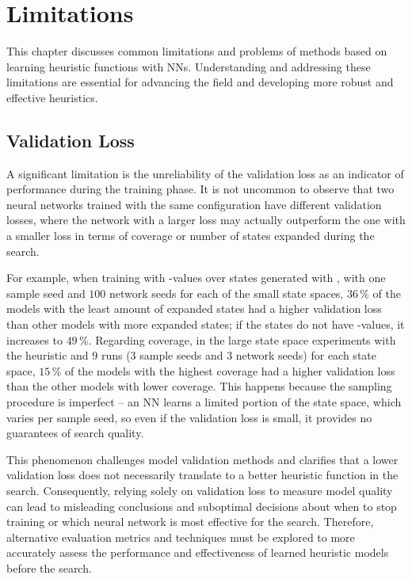 \chapter{Limitations}
\label{sec:limitations}

This chapter discusses common limitations and problems of methods based on learning heuristic functions with NNs. Understanding and addressing these limitations are essential for advancing the field and developing more robust and effective heuristics.

\section{Validation Loss}

A significant limitation is the unreliability of the validation loss as an indicator of performance during the training phase. It is not uncommon to observe that two neural networks trained with the same configuration have different validation losses, where the network with a larger loss may actually outperform the one with a smaller loss in terms of coverage or number of states expanded during the search.

For example, when training with \hstar-values over states generated with \bfsrw, with one sample seed and $100$ network seeds for each of the small state spaces, $36\,\%$ of the models with the least amount of expanded states had a higher validation loss than other models with more expanded states; if the states do not have \hstar-values, it increases to $49\,\%$. Regarding coverage, in the large state space experiments with the heuristic \hnnrs and $9$ runs ($3$ sample seeds and $3$ network seeds) for each state space, $15\,\%$ of the models with the highest coverage had a higher validation loss than the other models with lower coverage. This happens because the sampling procedure is imperfect -- an NN learns a limited portion of the state space, which varies per sample seed, so even if the validation loss is small, it provides no guarantees of search quality.

This phenomenon challenges model validation methods and clarifies that a lower validation loss does not necessarily translate to a better heuristic function in the search. Consequently, relying solely on validation loss to measure model quality can lead to misleading conclusions and suboptimal decisions about when to stop training or which neural network is most effective for the search. Therefore, alternative evaluation metrics and techniques must be explored to more accurately assess the performance and effectiveness of learned heuristic models before the search.

